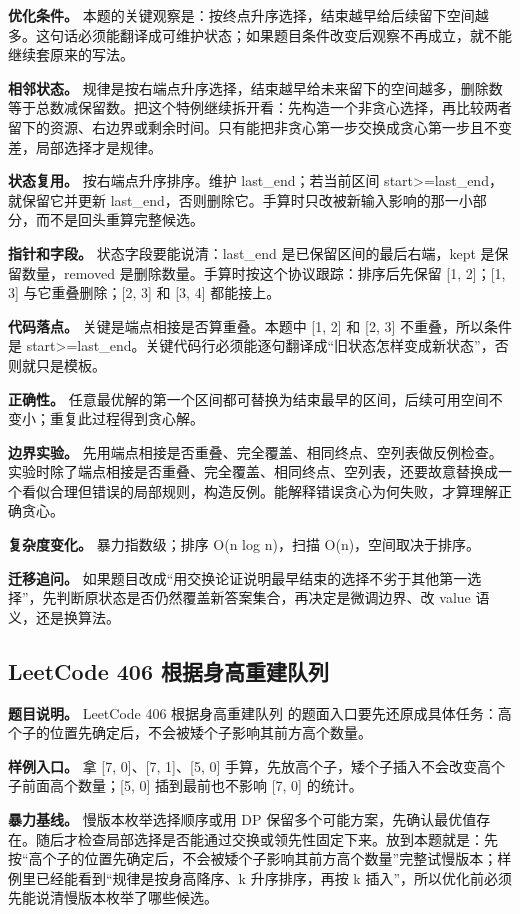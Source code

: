 \textbf{优化条件。} 本题的关键观察是：按终点升序选择，结束越早给后续留下空间越多。这句话必须能翻译成可维护状态；如果题目条件改变后观察不再成立，就不能继续套原来的写法。

\textbf{相邻状态。} 规律是按右端点升序选择，结束越早给未来留下的空间越多，删除数等于总数减保留数。把这个特例继续拆开看：先构造一个非贪心选择，再比较两者留下的资源、右边界或剩余时间。只有能把非贪心第一步交换成贪心第一步且不变差，局部选择才是规律。

\textbf{状态复用。} 按右端点升序排序。维护 last\_end；若当前区间 start>=last\_end，就保留它并更新 last\_end，否则删除它。手算时只改被新输入影响的那一小部分，而不是回头重算完整候选。

\textbf{指针和字段。} 状态字段要能说清：last\_end 是已保留区间的最后右端，kept 是保留数量，removed 是删除数量。手算时按这个协议跟踪：排序后先保留 [1, 2]；[1, 3] 与它重叠删除；[2, 3] 和 [3, 4] 都能接上。

\textbf{代码落点。} 关键是端点相接是否算重叠。本题中 [1, 2] 和 [2, 3] 不重叠，所以条件是 start>=last\_end。关键代码行必须能逐句翻译成“旧状态怎样变成新状态”，否则就只是模板。

\textbf{正确性。} 任意最优解的第一个区间都可替换为结束最早的区间，后续可用空间不变小；重复此过程得到贪心解。

\textbf{边界实验。} 先用端点相接是否重叠、完全覆盖、相同终点、空列表做反例检查。实验时除了端点相接是否重叠、完全覆盖、相同终点、空列表，还要故意替换成一个看似合理但错误的局部规则，构造反例。能解释错误贪心为何失败，才算理解正确贪心。

\textbf{复杂度变化。} 暴力指数级；排序 O(n log n)，扫描 O(n)，空间取决于排序。

\textbf{迁移追问。} 如果题目改成“用交换论证说明最早结束的选择不劣于其他第一选择”，先判断原状态是否仍然覆盖新答案集合，再决定是微调边界、改 value 语义，还是换算法。

\subsection{LeetCode 406 根据身高重建队列}

\textbf{题目说明。} LeetCode 406 根据身高重建队列 的题面入口要先还原成具体任务：高个子的位置先确定后，不会被矮个子影响其前方高个数量。

\textbf{样例入口。} 拿 [7, 0]、[7, 1]、[5, 0] 手算，先放高个子，矮个子插入不会改变高个子前面高个数量；[5, 0] 插到最前也不影响 [7, 0] 的统计。

\textbf{暴力基线。} 慢版本枚举选择顺序或用 DP 保留多个可能方案，先确认最优值存在。随后才检查局部选择是否能通过交换或领先性固定下来。放到本题就是：先按“高个子的位置先确定后，不会被矮个子影响其前方高个数量”完整试慢版本；样例里已经能看到“规律是按身高降序、k 升序排序，再按 k 插入”，所以优化前必须先能说清慢版本枚举了哪些候选。

